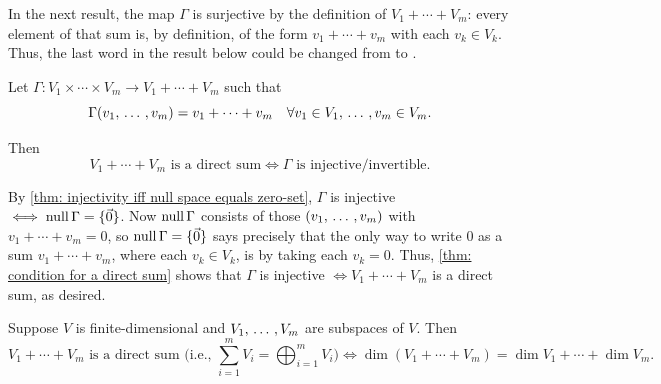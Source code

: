 In the next result, the map $\Gamma$ is surjective by the definition of $V_1 + \cdots + V_m$: every element of that sum is, by definition, of the form $v_1 + \cdots + v_m$ with each $v_k \in V_k$. Thus, the last word in the result below could be changed from  to .

\begin{thm}
  \label{thm: products and direct sums}
  Let $\Gamma: V_1 \times \cdots \times V_m \to V_1 + \cdots + V_m$ such that
  \begin{equation}
    \Gamma(v_1, {\, \ldots \,\,}, v_m) = v_1 + \cdots + v_m \quad \forall v_1 \in V_1, {\, \ldots \,\,}, v_m \in V_m.
  \end{equation}

  Then
  \begin{equation}
    V_1 + \cdots + V_m \text{ is a direct sum} \iff \Gamma \text{ is injective/invertible.}
  \end{equation}

\end{thm}
\begin{prf}
  By \ref{thm: injectivity iff null space equals zero-set}, $\Gamma$ is injective $\iff \operatorname{null} \Gamma = \{ \vec 0 \}$. Now $\operatorname{null} \Gamma$ consists of those $(v_1, {\, \ldots \,\,}, v_m)$ with $v_1 + \cdots + v_m = 0$, so $\operatorname{null} \Gamma = \{ \vec 0 \}$ says precisely that the only way to write $0$ as a sum $v_1 + \cdots + v_m$, where each $v_k \in V_k$, is by taking each $v_k=0$. Thus, \ref{thm: condition for a direct sum} shows that $\Gamma$ is injective $\iff V_1 + \cdots + V_m$ is a direct sum, as desired.
\end{prf}

\begin{thm}
  \label{thm: a sum is a direct sum if and only if the dimensions add up}
  Suppose $V$ is finite-dimensional and $V_1, {\, \ldots \,\,},V_m$ are subspaces of $V$. Then
  \begin{equation}
    V_1 + \cdots + V_m \text{ is a direct sum (i.e., } \sum_{i=1}^m V_i = \bigoplus_{i=1}^m V_i \text{)} \iff
    \dim (V_1+\cdots+V_m) = \dim V_1 + \cdots + \dim V_m.
  \end{equation}
\end{thm}

